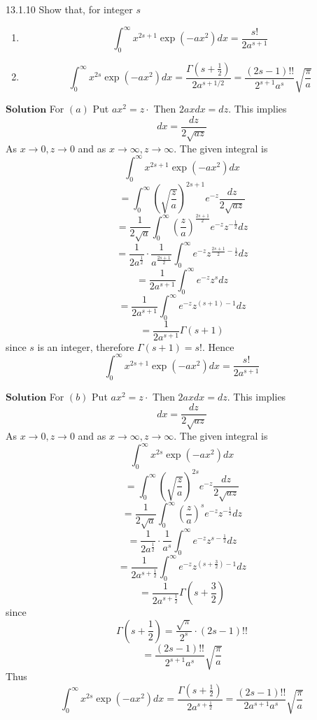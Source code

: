 \documentclass{article}
\begin{document}
\begin{flushleft}
\newpage

\begin{mybox}{13.1.10}
Show that, for integer $s$
\begin{enumerate}[$(a)$]
\item $$\int_{0}^{\infty} x^{2 s+1} \exp \left(-a x^{2}\right) d x=\frac{s !}{2 a^{s+1}}$$
\item $$\int_{0}^{\infty} x^{2 s} \exp \left(-a x^{2}\right) d x=\frac{\Gamma\left(s+\frac{1}{2}\right)}{2 a^{s+1 / 2}}=\frac{(2 s-1) ! !}{2^{s+1} a^{s}} \sqrt{\frac{\pi}{a}}$$
\end{enumerate}


\end{mybox}
$\boxed{\textbf{Solution}}$ For $(a)$ Put $a x^{2}=z \cdot$ Then $2 a x d x=d z$. This implies
$$
d x=\frac{d z}{2 \sqrt{a z}}
$$
As $x \rightarrow 0, z \rightarrow 0$ and as $x \rightarrow \infty, z \rightarrow \infty$.
The given integral is
$$
\int_{0}^{\infty} x^{2 s+1} \exp \left(-a x^{2}\right) d x
$$
$$
=\int_{0}^{\infty}\left(\sqrt{\frac{z}{a}}\right)^{2 s+1} e^{-z} \frac{d z}{2 \sqrt{a z}}
$$
$$
=\frac{1}{2 \sqrt{a}} \int_{0}^{\infty}\left(\frac{z}{a}\right)^{\frac{2 s+1}{2}} e^{-z} z^{-\frac{1}{2}} d z
$$
$$
=\frac{1}{2 a^{\frac{1}{2}}} \cdot \frac{1}{a^{\frac{2 s+1}{2}}} \int_{0}^{\infty} e^{-z} z^{\frac{2 s+1}{2}-\frac{1}{2}} d z
$$
$$
=\frac{1}{2 a^{s+1}} \int_{0}^{\infty} e^{-z} z^{s} d z
$$
$$
=\frac{1}{2 a^{s+1}} \int_{0}^{\infty} e^{-z} z^{(s+1)-1} d z
$$
$$
=\frac{1}{2 a^{s+1}} \Gamma(s+1)
$$
since $s$ is an integer, therefore $\Gamma(s+1)=s !$. Hence 
$$\int_{0}^{\infty} x^{2 s+1} \exp \left(-a x^{2}\right) d x=\frac{s !}{2 a^{s+1}}$$ 

$\boxed{\textbf{Solution}}$ For $(b)$ Put $a x^{2}=z \cdot$ Then $2 a x d x=d z$. This implies
$$
d x=\frac{d z}{2 \sqrt{a z}}
$$
As $x \rightarrow 0, z \rightarrow 0$ and as $x \rightarrow \infty, z \rightarrow \infty$.
The given integral is
$$
\int_{0}^{\infty} x^{2 s} \exp \left(-a x^{2}\right) d x
$$
$$
=\int_{0}^{\infty}\left(\sqrt{\frac{z}{a}}\right)^{2 s} e^{-z} \frac{d z}{2 \sqrt{a z}}
$$
$$
=\frac{1}{2 \sqrt{a}} \int_{0}^{\infty}\left(\frac{z}{a}\right)^{s} e^{-z} z^{-\frac{1}{2}} d z
$$
$$
=\frac{1}{2 a^{\frac{1}{2}}} \cdot \frac{1}{a^{s}} \int_{0}^{\infty} e^{-z} z^{s-\frac{1}{2}} d z
$$
$$
=\frac{1}{2 a^{s+\frac{1}{2}}} \int_{0}^{\infty} e^{-z} z^{\left(s+\frac{3}{2}\right)-1} d z
$$
$$
=\frac{1}{2 a^{s+\frac{1}{2}}} \Gamma\left(s+\frac{3}{2}\right)
$$
since 
$$\Gamma\left(s+\frac{1}{2}\right)=\frac{\sqrt{\pi}}{2^{s}} \cdot(2 s-1) ! !$$
$$
=\frac{(2 s-1) ! !}{2^{s+1} a^{s}} \sqrt{\frac{\pi}{a}}
$$
Thus
$$
\int_{0}^{\infty} x^{2 s} \exp \left(-a x^{2}\right) d x=\frac{\Gamma\left(s+\frac{1}{2}\right)}{2 a^{s+\frac{1}{2}}}=\frac{(2 s-1) ! !}{2 a^{s+1} a^{s}} \sqrt{\frac{\pi}{a}}
$$


\end{flushleft}
\end{document}
